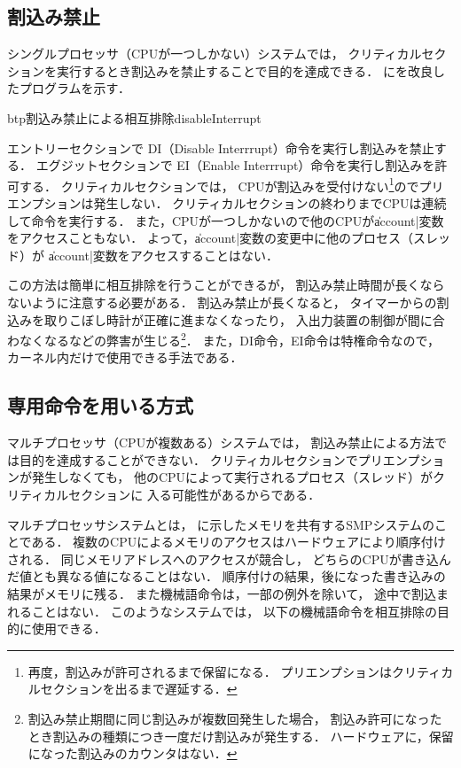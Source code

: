 \subsection{割込み禁止}
\label{disableInterrupt}
シングルプロセッサ（CPUが一つしかない）システムでは，
クリティカルセクションを実行するとき割込みを禁止することで目的を達成できる．
にを改良したプログラムを示す．

\begin{myfig}{btp}{割込み禁止による相互排除}{disableInterrupt}

\end{myfig}

エントリーセクションで
DI（Disable Interrrupt）命令を実行し割込みを禁止する．
エグジットセクションで
EI（Enable Interrrupt）命令を実行し割込みを許可する．
クリティカルセクションでは，
CPUが割込みを受付けない\footnote{
再度，割込みが許可されるまで保留になる．
プリエンプションはクリティカルセクションを出るまで遅延する．
}のでプリエンプションは発生しない．
クリティカルセクションの終わりまでCPUは連続して命令を実行する．
また，CPUが一つしかないので他のCPUが\|account|変数をアクセスこともない．
よって，\|account|変数の変更中に他のプロセス（スレッド）が
\|account|変数をアクセスすることはない．

この方法は簡単に相互排除を行うことができるが，
割込み禁止時間が長くならないように注意する必要がある．
割込み禁止が長くなると，
タイマーからの割込みを取りこぼし時計が正確に進まなくなったり，
入出力装置の制御が間に合わなくなるなどの弊害が生じる\footnote{
割込み禁止期間に同じ割込みが複数回発生した場合，
割込み許可になったとき割込みの種類につき一度だけ割込みが発生する．
ハードウェアに，保留になった割込みのカウンタはない．}．
また，DI命令，EI命令は特権命令なので，
カーネル内だけで使用できる手法である．

\subsection{専用命令を用いる方式}
マルチプロセッサ（CPUが複数ある）システムでは，
割込み禁止による方法では目的を達成することができない．
クリティカルセクションでプリエンプションが発生しなくても，
他のCPUによって実行されるプロセス（スレッド）がクリティカルセクションに
入る可能性があるからである．

マルチプロセッサシステムとは，
に示したメモリを共有するSMPシステムのことである．
複数のCPUによるメモリのアクセスはハードウェアにより順序付けされる．
同じメモリアドレスへのアクセスが競合し，
どちらのCPUが書き込んだ値とも異なる値になることはない．
順序付けの結果，後になった書き込みの結果がメモリに残る．
また機械語命令は，一部の例外を除いて，
途中で割込まれることはない．
このようなシステムでは，
以下の機械語命令を相互排除の目的に使用できる．

